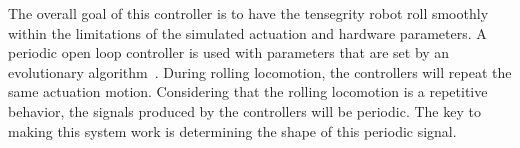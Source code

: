


The overall goal of this controller is to have the tensegrity robot roll smoothly within the limitations of the simulated actuation and hardware parameters. 
A periodic open loop controller is used with parameters that are set by an evolutionary algorithm~\cite{back1997handbook}. 
During rolling locomotion, the controllers will repeat the same actuation motion. 
Considering that the rolling locomotion is a repetitive behavior, the signals produced by the controllers will be periodic. 
The key to making this system work is determining the shape of this periodic signal.

